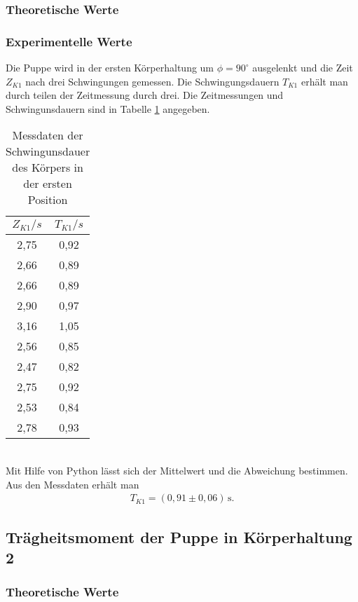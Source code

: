 \subsubsection{Theoretische Werte}

\subsubsection{Experimentelle Werte}
Die Puppe wird in der ersten Körperhaltung um $\phi = 90^{\circ}$ ausgelenkt und die Zeit $Z_{K1}$ nach drei
Schwingungen gemessen. Die Schwingungsdauern $T_{K1}$ erhält man durch teilen der Zeitmessung durch drei. Die Zeitmessungen und
Schwingunsdauern sind in Tabelle \ref{tab:Koerper1} angegeben.
\begin{table}
  \centering
  \caption{Messdaten der Schwingunsdauer des Körpers in der ersten Position}
  \label{tab:Koerper1}
  \begin{tabular}{c c}
    \toprule
    $Z_{K1}/s$ & $T_{K1}/s$ \\
    \midrule
    2,75 & 0,92 \\
    2,66 & 0,89 \\
    2,66 & 0,89 \\
    2,90 & 0,97 \\
    3,16 & 1,05 \\
    2,56 & 0,85 \\
    2,47 & 0,82 \\
    2,75 & 0,92 \\
    2,53 & 0,84 \\
    2,78 & 0,93 \\
    \bottomrule
  \end{tabular}
\end{table}
\\
Mit Hilfe von Python lässt sich der Mittelwert und die Abweichung bestimmen. Aus den Messdaten
erhält man
\begin{align*}
  T_{K1} = (0{,}91 \pm 0{,}06)\, \mathrm{s} .
\end{align*}

\subsection{Trägheitsmoment der Puppe in Körperhaltung 2}
\label{TraegheitsmomentderPuppeinKoerperhaltung2}
\subsubsection{Theoretische Werte}

